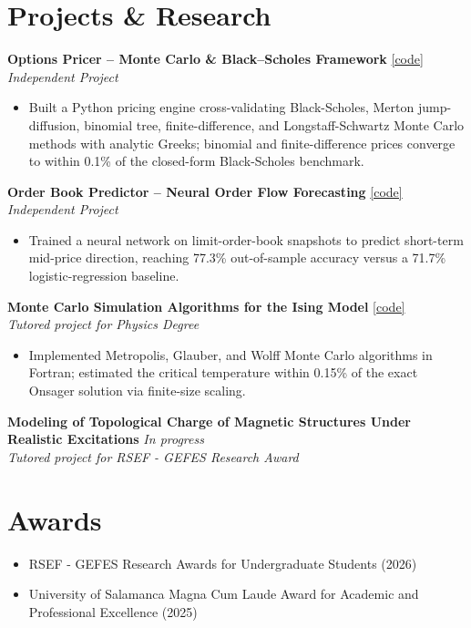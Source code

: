 \documentclass[a4paper]{article}
\begin{document}
\vspace{0.08cm}

\section*{Projects \& Research}

\textbf{Options Pricer -- Monte Carlo \& Black--Scholes Framework} \hfill \href{https://github.com/pablolopse/options_pricer}{[code]} \\
\textit{Independent Project}
\begin{itemize}
    \item Built a Python pricing engine cross-validating Black-Scholes, Merton jump-diffusion, binomial tree, finite-difference, and Longstaff-Schwartz Monte Carlo methods with analytic Greeks; binomial and finite-difference prices converge to within 0.1\% of the closed-form Black-Scholes benchmark.
\end{itemize}

\textbf{Order Book Predictor -- Neural Order Flow Forecasting} \hfill \href{https://github.com/pablolopse/orderbook_predictors}{[code]} \\
\textit{Independent Project}
\begin{itemize}
    \item Trained a neural network on limit-order-book snapshots to predict short-term mid-price direction, reaching 77.3\% out-of-sample accuracy versus a 71.7\% logistic-regression baseline.
\end{itemize}

\textbf{Monte Carlo Simulation Algorithms for the Ising Model} \hfill \href{https://github.com/pablolopse/ising-model-simulation}{[code]} \\
\textit{Tutored project for Physics Degree}
\begin{itemize}
    \item Implemented Metropolis, Glauber, and Wolff Monte Carlo algorithms in Fortran; estimated the critical temperature within 0.15\% of the exact Onsager solution via finite-size scaling.
\end{itemize}

\textbf{Modeling of Topological Charge of Magnetic Structures Under Realistic Excitations} \hfill \textit{In progress} \\
\textit{Tutored project for RSEF - GEFES Research Award}

\vspace{0.08cm}

\section*{Awards}
\begin{itemize}
    \item RSEF - GEFES Research Awards for Undergraduate Students (2026)
    \item University of Salamanca Magna Cum Laude Award for Academic and Professional Excellence (2025)
\end{itemize}
\end{document}
